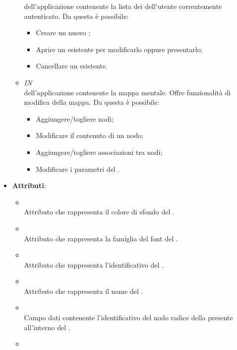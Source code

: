 \begin{itemize}
\begin{itemize}
 dell’applicazione contenente la lista dei  dell’utente correntemente autenticato.
Da questa  è possibile:
\begin{itemize}
\item Creare un nuovo ;
\item Aprire un  esistente per modificarlo oppure presentarlo;
\item Cancellare un  esistente.
\end{itemize}
\item \textit{IN} \hyperref[\nogloxy{Premi::Front-End::Views::MindmapEditorView}]{}\\
 dell’applicazione contenente la mappa mentale. Offre funzionalità di modifica della mappa.
Da questa  è possibile:
\begin{itemize}
\item Aggiungere/togliere nodi;
\item Modificare il contenuto di un nodo;
\item Aggiungere/togliere associazioni tra nodi;
\item Modificare i parametri del .
\end{itemize}
\end{itemize}
\item \textbf{Attributi}:
\begin{itemize}
\item {}
\\ Attributo che rappresenta il colore di sfondo del .
\item {}
\\ Attributo che rappresenta la famiglia del font del .
\item {}
\\ Attributo che rappresenta l'identificativo del .
\item {}
\\ Attributo che rappresenta il nome del .
\item {}
\\ Campo dati contenente l'identificativo del nodo radice della  presente all'interno del .
\item {}

\end{itemize}
\end{itemize}
